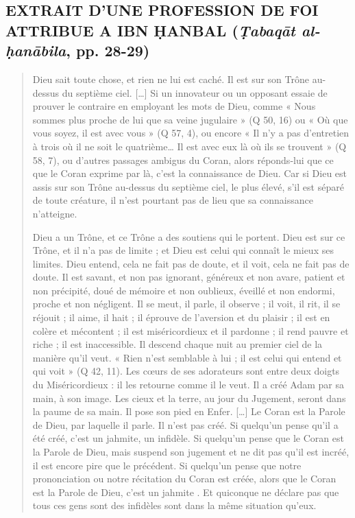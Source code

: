 \subsection{EXTRAIT D'UNE PROFESSION DE FOI ATTRIBUE A IBN ḤANBAL
(\emph{Ṭabaqāt al-ḥanābila}, pp. 28-29)}
\begin{quote}
    Dieu sait toute chose, et rien ne lui est caché. Il est sur son Trône
au-dessus du septième ciel. {[}\ldots{]} Si un
innovateur ou un opposant essaie de prouver le
contraire en employant les mots de Dieu, comme « Nous sommes plus proche
de lui que sa veine jugulaire » (Q 50, 16) ou « Où que vous soyez, il
est avec vous » (Q 57, 4), ou encore « Il n'y a pas d'entretien à trois
où il ne soit le quatrième\ldots{} Il est avec eux là où ils se trouvent
» (Q 58, 7), ou d'autres passages ambigus du Coran, alors réponds-lui
que ce que le Coran exprime par là, c'est la connaissance de Dieu. Car
si Dieu est assis sur son Trône au-dessus du septième ciel, le plus
élevé, s'il est séparé de toute créature, il n'est pourtant pas de lieu
que sa connaissance n'atteigne.

Dieu a un Trône, et ce Trône a des soutiens qui le portent. Dieu est sur
ce Trône, et il n'a pas de limite ; et Dieu est celui qui connaît le
mieux ses limites. Dieu entend, cela ne fait pas de doute, et il voit,
cela ne fait pas de doute. Il est savant, et non pas ignorant, généreux
et non avare, patient et non précipité, doué de mémoire et non oublieux,
éveillé et non endormi, proche et non négligent. Il se meut, il parle,
il observe ; il voit, il rit, il se réjouit ; il aime, il hait ; il
éprouve de l'aversion et du plaisir ; il est en colère et mécontent ; il
est miséricordieux et il pardonne ; il rend pauvre et riche ; il est
inaccessible. Il descend chaque nuit au premier ciel de la manière qu'il
veut. « Rien n'est semblable à lui ; il est celui qui entend et qui voit
» (Q 42, 11). Les cœurs de ses adorateurs sont entre deux doigts du
Miséricordieux : il les retourne comme il le veut. Il a créé Adam par sa
main,
à son image. Les cieux et la terre, au jour du Jugement, seront dans la paume de sa main. Il pose son pied en Enfer. […]
Le Coran est la Parole de Dieu, par laquelle il parle. Il n’est pas créé. Si quelqu’un pense qu’il a été créé, c’est un jahmite, un infidèle. Si quelqu’un pense que le Coran est la Parole de Dieu, mais suspend son jugement et ne dit pas qu’il est incréé, il est encore pire que le précédent. Si quelqu’un pense que notre prononciation ou notre récitation du Coran est créée, alors que le Coran est la Parole de Dieu, c’est un jahmite . Et quiconque ne déclare pas que tous ces gens sont des infidèles sont dans la même situation qu’eux.
\end{quote}




